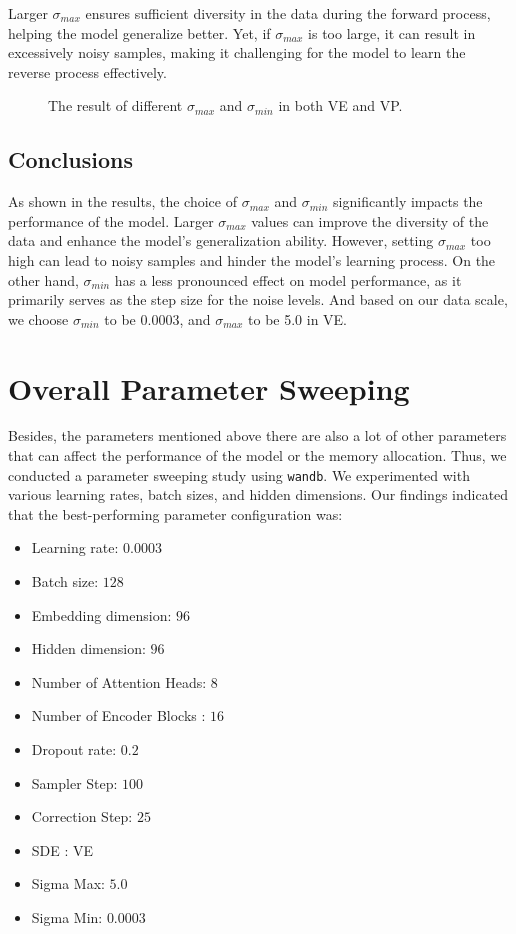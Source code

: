 Larger $\sigma_{max}$ ensures sufficient diversity in the data during the forward process, helping the model generalize better. Yet, if $\sigma_{max}$ is too large, it can result in excessively noisy samples, making it challenging for the model to learn the reverse process effectively.

\begin{figure}[ht]
    \centering
    \caption{The result of different $\sigma_{max}$ and $\sigma_{min}$ in both VE and VP.}
\end{figure}

\subsection{Conclusions}

As shown in the results, the choice of $\sigma_{max}$ and $\sigma_{min}$ significantly impacts the performance of the model. Larger $\sigma_{max}$ values can improve the diversity of the data and enhance the model's generalization ability. However, setting $\sigma_{max}$ too high can lead to noisy samples and hinder the model's learning process. On the other hand, $\sigma_{min}$ has a less pronounced effect on model performance, as it primarily serves as the step size for the noise levels. And based on our data scale, we choose $\sigma_{min}$ to be 0.0003, and $\sigma_{max}$ to be 5.0 in VE.

\section{Overall Parameter Sweeping}
Besides, the parameters mentioned above there are also a lot of other parameters that can affect the performance of the model or the memory allocation. Thus, we conducted a parameter sweeping study using \texttt{wandb}. We experimented with various learning rates, batch sizes, and hidden dimensions. Our findings indicated that the best-performing parameter configuration was:
\begin{itemize}
    \item Learning rate: $0.0003$
    \item Batch size: $128$
    \item Embedding dimension: $96$
    \item Hidden dimension: $96$
    \item Number of Attention Heads: $8$
    \item Number of Encoder Blocks : $16$
    \item Dropout rate: $0.2$
    \item Sampler Step: $100$
    \item Correction Step: $25$
    \item SDE : VE
    \item Sigma Max: $5.0$
    \item Sigma Min: $0.0003$
\end{itemize}

